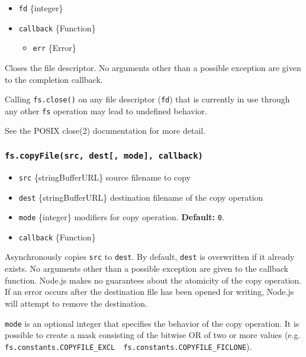 \begin{itemize}
\tightlist
\item
  \texttt{fd} \{integer\}
\item
  \texttt{callback} \{Function\}

  \begin{itemize}
  \tightlist
  \item
    \texttt{err} \{Error\}
  \end{itemize}
\end{itemize}

Closes the file descriptor. No arguments other than a possible exception
are given to the completion callback.

Calling \texttt{fs.close()} on any file descriptor (\texttt{fd}) that is
currently in use through any other \texttt{fs} operation may lead to
undefined behavior.

See the POSIX close(2) documentation for more detail.

\subsubsection{\texorpdfstring{\texttt{fs.copyFile(src,\ dest{[},\ mode{]},\ callback)}}{fs.copyFile(src, dest{[}, mode{]}, callback)}}\label{fs.copyfilesrc-dest-mode-callback}

\begin{itemize}
\tightlist
\item
  \texttt{src} \{string\textbar Buffer\textbar URL\} source filename to
  copy
\item
  \texttt{dest} \{string\textbar Buffer\textbar URL\} destination
  filename of the copy operation
\item
  \texttt{mode} \{integer\} modifiers for copy operation.
  \textbf{Default:} \texttt{0}.
\item
  \texttt{callback} \{Function\}
\end{itemize}

Asynchronously copies \texttt{src} to \texttt{dest}. By default,
\texttt{dest} is overwritten if it already exists. No arguments other
than a possible exception are given to the callback function. Node.js
makes no guarantees about the atomicity of the copy operation. If an
error occurs after the destination file has been opened for writing,
Node.js will attempt to remove the destination.

\texttt{mode} is an optional integer that specifies the behavior of the
copy operation. It is possible to create a mask consisting of the
bitwise OR of two or more values (e.g.
\texttt{fs.constants.COPYFILE\_EXCL\ \textbar{}\ fs.constants.COPYFILE\_FICLONE}).

